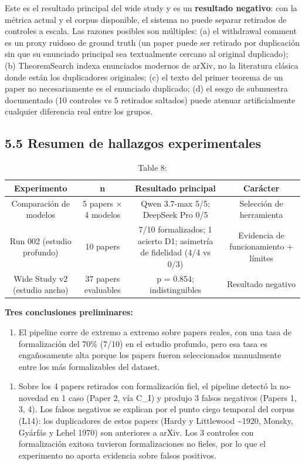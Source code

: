 \documentclass[12pt,a4paper]{article}
\theoremstyle{remark}
\begin{document}
Este es el resultado principal del wide study y es un \textbf{resultado negativo}: con la métrica actual y el corpus disponible, el sistema no puede separar retirados de controles a escala. Las razones posibles son múltiples: (a) el withdrawal comment es un proxy ruidoso de ground truth (un paper puede ser retirado por duplicación sin que su enunciado principal sea textualmente cercano al original duplicado); (b) TheoremSearch indexa enunciados modernos de arXiv, no la literatura clásica donde están los duplicadores originales; (c) el texto del primer teorema de un paper no necesariamente es el enunciado duplicado; (d) el sesgo de submuestra documentado (10 controles vs 5 retirados saltados) puede atenuar artificialmente cualquier diferencia real entre los grupos.


\subsection{5.5 Resumen de hallazgos experimentales}

\begin{table}[htbp]
\centering
\begin{tabular}{|c|c|c|c|}
\hline
Experimento & n & Resultado principal & Carácter \\
\hline
Comparación de modelos & 5 papers × 4 modelos & Qwen 3.7-max 5/5; DeepSeek Pro 0/5 & Selección de herramienta \\
Run 002 (estudio profundo) & 10 papers & 7/10 formalizados; 1 acierto D1; asimetría de fidelidad (4/4 vs 0/3) & Evidencia de funcionamiento + límites \\
Wide Study v2 (estudio ancho) & 37 papers evaluables & p = 0.854; indistinguibles & Resultado negativo \\
\hline
\end{tabular}
\caption{Table 8: }
\label{tab:8}
\end{table}


\textbf{Tres conclusiones preliminares:}

\begin{enumerate}
\item El pipeline corre de extremo a extremo sobre papers reales, con una tasa de formalización del 70\% (7/10) en el estudio profundo, pero esa tasa es engañosamente alta porque los papers fueron seleccionados manualmente entre los más formalizables del dataset.
\end{enumerate}

\begin{enumerate}
\item Sobre los 4 papers retirados con formalización fiel, el pipeline detectó la no-novedad en 1 caso (Paper 2, vía C\_I) y produjo 3 falsos negativos (Papers 1, 3, 4). Los falsos negativos se explican por el punto ciego temporal del corpus (L14): los duplicadores de estos papers (Hardy y Littlewood \textasciitilde{}1920, Monsky, Gyárfás y Lehel 1970) son anteriores a arXiv. Los 3 controles con formalización exitosa tuvieron formalizaciones no fieles, por lo que el experimento no aporta evidencia sobre falsos positivos.
\end{enumerate}
\end{document}
